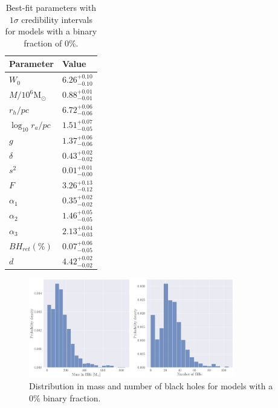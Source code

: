 \begin{table}
	\centering
\caption{Best-fit parameters with $1\sigma$ credibility intervals for models with a binary fraction of $0\%$.}
	\begin{tabular}{l l}

		\hline
		Parameter                 & Value                  \\
		\hline
$W_0$                  & $6.26^{+0.10}_{-0.10}$ \\
		$M/10^6 \mathrm{M}_\odot$ & $0.88^{+0.01}_{-0.01}$ \\
		$r_h / pc$                & $6.72^{+0.06}_{-0.06}$ \\
$\log_{10}{r_a / pc}$     & $1.51^{+0.07}_{-0.05}$ \\
		$g$                       & $1.37^{+0.06}_{-0.06}$ \\
		$\delta$                  & $0.43^{+0.02}_{-0.02}$ \\
		$s^2$                     & $0.01^{+0.01}_{-0.00}$ \\
		$F$                       & $3.26^{+0.13}_{-0.12}$ \\
		$\alpha_1$                & $0.35^{+0.02}_{-0.02}$ \\
		$\alpha_2$                & $1.46^{+0.05}_{-0.05}$ \\
		$\alpha_3$                & $2.13^{+0.04}_{-0.03}$ \\
		$BH_{ret} (\%)$           & $0.07^{+0.06}_{-0.05}$ \\
		$d$                       & $4.42^{+0.02}_{-0.02}$ \\
		\hline
	\end{tabular}
	\label{tab:parameters_nobin}
\end{table}

\begin{figure}
	\centering
	\includegraphics[width=0.8\textwidth]{figures/prev_nobin/BH_dists.png}
\caption{Distribution in mass and number of black holes for models with a $0\%$ binary
	fraction.}
	\label{fig:prev_nobin_BH_dists}
\end{figure}


